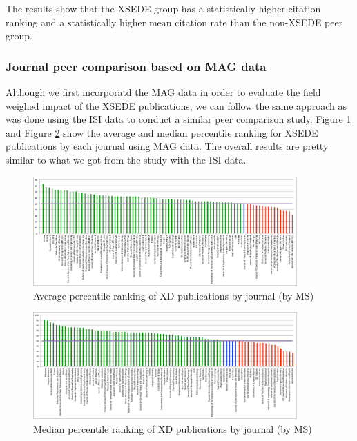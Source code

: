 \documentclass{sig-alternate}
\begin{document}
The results show that the XSEDE group has a statistically higher
citation ranking and a statistically higher mean citation rate than
the non-XSEDE peer group.

\subsubsection{Journal peer comparison based on MAG data}

Although we first incorporatd the MAG data in order to evaluate the
field weighed impact of the XSEDE publications, we can follow the same
approach as was done using the ISI data to conduct a similar peer
comparison study. Figure \ref{F:ms_peers_byj_mean} and Figure
\ref{F:ms_peers_byj_median} show the average and median percentile
ranking for XSEDE publications by each journal using MAG data. The
overall results are pretty similar to what we got from the study with
the ISI data.

\begin{figure}[htb!]
  \centering
    \includegraphics[width=0.9\textwidth]{images/ms_peers_byj_mean_10.pdf}
    \caption{Average percentile ranking of XD publications by journal (by MS)}
    \label{F:ms_peers_byj_mean}
\end{figure}

\begin{figure}[htb!]
  \centering
    \includegraphics[width=0.9\textwidth]{images/ms_peers_byj_median_10.pdf}
    \caption{Median percentile ranking of XD publications by journal (by MS)}
    \label{F:ms_peers_byj_median}
\end{figure}
\end{document}
